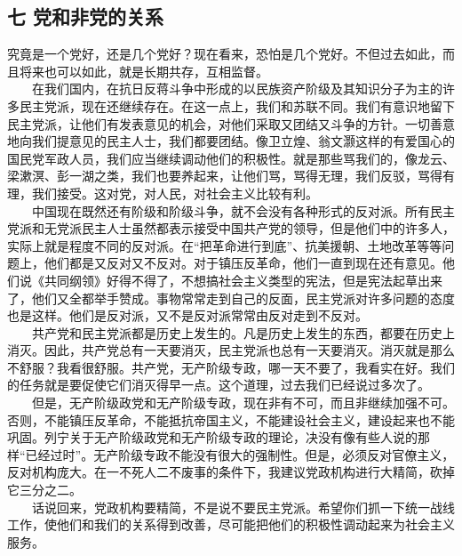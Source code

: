 \documentclass[cn,11pt,chinese]{elegantbook}
\def\myformat#1{\hfil\hfil #1}
\begin{document}
\subsection*{\myformat{七 党和非党的关系}}
究竟是一个党好，还是几个党好？现在看来，恐怕是几个党好。不但过去如此，而且将来也可以如此，就是长期共存，互相监督。\\
　　在我们国内，在抗日反蒋斗争中形成的以民族资产阶级及其知识分子为主的许多民主党派，现在还继续存在。在这一点上，我们和苏联不同。我们有意识地留下民主党派，让他们有发表意见的机会，对他们采取又团结又斗争的方针。一切善意地向我们提意见的民主人士，我们都要团结。像卫立煌、翁文灏这样的有爱国心的国民党军政人员，我们应当继续调动他们的积极性。就是那些骂我们的，像龙云、梁漱溟、彭一湖之类，我们也要养起来，让他们骂，骂得无理，我们反驳，骂得有理，我们接受。这对党，对人民，对社会主义比较有利。\\
　　中国现在既然还有阶级和阶级斗争，就不会没有各种形式的反对派。所有民主党派和无党派民主人士虽然都表示接受中国共产党的领导，但是他们中的许多人，实际上就是程度不同的反对派。在“把革命进行到底”、抗美援朝、土地改革等等问题上，他们都是又反对又不反对。对于镇压反革命，他们一直到现在还有意见。他们说《共同纲领》好得不得了，不想搞社会主义类型的宪法，但是宪法起草出来了，他们又全都举手赞成。事物常常走到自己的反面，民主党派对许多问题的态度也是这样。他们是反对派，又不是反对派常常由反对走到不反对。\\
　　共产党和民主党派都是历史上发生的。凡是历史上发生的东西，都要在历史上消灭。因此，共产党总有一天要消灭，民主党派也总有一天要消灭。消灭就是那么不舒服？我看很舒服。共产党，无产阶级专政，哪一天不要了，我看实在好。我们的任务就是要促使它们消灭得早一点。这个道理，过去我们已经说过多次了。\\
　　但是，无产阶级政党和无产阶级专政，现在非有不可，而且非继续加强不可。否则，不能镇压反革命，不能抵抗帝国主义，不能建设社会主义，建设起来也不能巩固。列宁关于无产阶级政党和无产阶级专政的理论，决没有像有些人说的那样“已经过时”。无产阶级专政不能没有很大的强制性。但是，必须反对官僚主义，反对机构庞大。在一不死人二不废事的条件下，我建议党政机构进行大精简，砍掉它三分之二。\\
　　话说回来，党政机构要精简，不是说不要民主党派。希望你们抓一下统一战线工作，使他们和我们的关系得到改善，尽可能把他们的积极性调动起来为社会主义服务。\\
\end{document}
